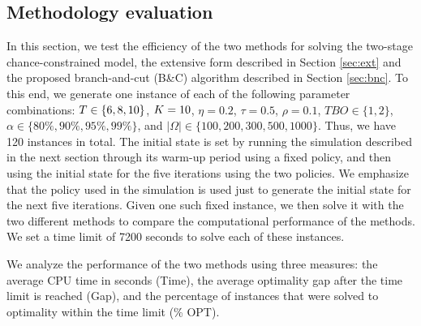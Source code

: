 \documentclass[msom]{oo}
\begin{document}
\subsection{Methodology evaluation}
\label{ss:method}
In this section, we test the efficiency of the two methods for solving the two-stage chance-constrained model, the extensive form described in Section \ref{sec:ext} and the proposed branch-and-cut (B\&C) algorithm described in Section \ref{sec:bnc}. To this end, we generate one instance  of each of the following parameter combinations: $T \in \{  6, 8 , 10\}$, $K = 10$,
$\eta =  0.2 $,
$\tau = 0.5 $,
$\rho = 0.1$,
$ TBO \in \{1, 2\} $,
$ \alpha \in \{80\%, 90\%, 95\%, 99\% \}$, and $|\Omega| \in \{100,200,300,500,1000\}$. Thus, we have 120 instances in total.
The initial state is set by running the simulation described in the next section through its warm-up period using a fixed policy, and then using the initial state for the five iterations using the two policies. We emphasize that the policy used in the simulation is used just to generate the initial state for the next five iterations. Given one such fixed instance, we then solve it with the two different methods to compare the computational performance of the methods. We set a time limit of 7200 seconds to solve each of these instances.

  
We analyze the performance of the two methods using three measures: the average CPU time in seconds (Time), the average optimality gap after the time limit is reached (Gap), and the percentage of instances that were solved to optimality within the time limit (\% OPT).
\end{document}

